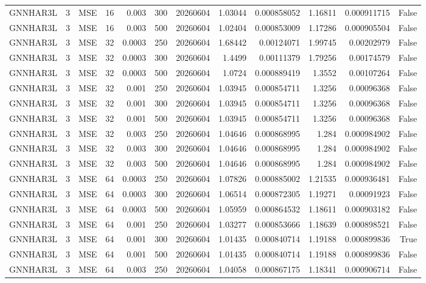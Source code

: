 \begin{tabular}{lrlrrrrrrrrr}
GNNHAR3L & 3 & MSE & 16 & 0.003 & 300 & 20260604 & 1.03044 & 0.000858052 & 1.16811 & 0.000911715 & False \\
GNNHAR3L & 3 & MSE & 16 & 0.003 & 500 & 20260604 & 1.02404 & 0.000853009 & 1.17286 & 0.000905504 & False \\
GNNHAR3L & 3 & MSE & 32 & 0.0003 & 250 & 20260604 & 1.68442 & 0.00124071 & 1.99745 & 0.00202979 & False \\
GNNHAR3L & 3 & MSE & 32 & 0.0003 & 300 & 20260604 & 1.4499 & 0.00111379 & 1.79256 & 0.00174579 & False \\
GNNHAR3L & 3 & MSE & 32 & 0.0003 & 500 & 20260604 & 1.0724 & 0.000889419 & 1.3552 & 0.00107264 & False \\
GNNHAR3L & 3 & MSE & 32 & 0.001 & 250 & 20260604 & 1.03945 & 0.000854711 & 1.3256 & 0.00096368 & False \\
GNNHAR3L & 3 & MSE & 32 & 0.001 & 300 & 20260604 & 1.03945 & 0.000854711 & 1.3256 & 0.00096368 & False \\
GNNHAR3L & 3 & MSE & 32 & 0.001 & 500 & 20260604 & 1.03945 & 0.000854711 & 1.3256 & 0.00096368 & False \\
GNNHAR3L & 3 & MSE & 32 & 0.003 & 250 & 20260604 & 1.04646 & 0.000868995 & 1.284 & 0.000984902 & False \\
GNNHAR3L & 3 & MSE & 32 & 0.003 & 300 & 20260604 & 1.04646 & 0.000868995 & 1.284 & 0.000984902 & False \\
GNNHAR3L & 3 & MSE & 32 & 0.003 & 500 & 20260604 & 1.04646 & 0.000868995 & 1.284 & 0.000984902 & False \\
GNNHAR3L & 3 & MSE & 64 & 0.0003 & 250 & 20260604 & 1.07826 & 0.000885002 & 1.21535 & 0.000936481 & False \\
GNNHAR3L & 3 & MSE & 64 & 0.0003 & 300 & 20260604 & 1.06514 & 0.000872305 & 1.19271 & 0.00091923 & False \\
GNNHAR3L & 3 & MSE & 64 & 0.0003 & 500 & 20260604 & 1.05959 & 0.000864532 & 1.18611 & 0.000903182 & False \\
GNNHAR3L & 3 & MSE & 64 & 0.001 & 250 & 20260604 & 1.03277 & 0.000853666 & 1.18639 & 0.000898521 & False \\
GNNHAR3L & 3 & MSE & 64 & 0.001 & 300 & 20260604 & 1.01435 & 0.000840714 & 1.19188 & 0.000899836 & True \\
GNNHAR3L & 3 & MSE & 64 & 0.001 & 500 & 20260604 & 1.01435 & 0.000840714 & 1.19188 & 0.000899836 & False \\
GNNHAR3L & 3 & MSE & 64 & 0.003 & 250 & 20260604 & 1.04058 & 0.000867175 & 1.18341 & 0.000906714 & False \\

\end{tabular}
